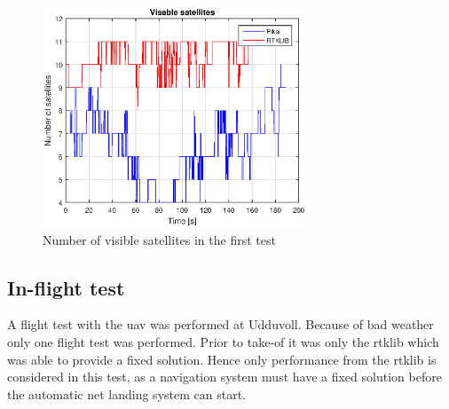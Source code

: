 \begin{figure}[H]
	\centering
		\includegraphics[width=0.7\textwidth]{figs/plots/numSatWalk2.eps}
		\caption{Number of visible satellites in the first test}
		\label{figure:numSatWalk2}
\end{figure}
\subsection{In-flight test}
A flight test with the \gls{uav} was performed at Udduvoll. Because of bad weather only one flight test was performed. Prior to take-of it was only the \gls{rtklib} which was able to provide a fixed solution. Hence only performance from the \gls{rtklib} is considered in this test, as a navigation system must have a fixed solution before the automatic net landing system can start.

